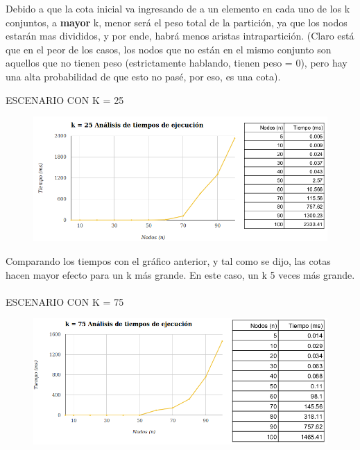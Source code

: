 Debido a que la cota inicial va ingresando de a un elemento en cada uno de los k conjuntos, a \textbf{mayor} k, menor será el peso total de la partición, ya que los nodos estarán mas divididos, y por ende, habrá menos aristas intrapartición. (Claro está que en el peor de los casos, los nodos que no están en el mismo conjunto son aquellos que no tienen peso (estrictamente hablando, tienen peso = 0), pero hay una alta probabilidad de que esto no pasé, por eso, es una cota).

\newpage ESCENARIO CON K = 25
	\begin{figure}[h]
		\begin{center}
		   \includegraphics[scale=0.80]{ejercicio2/k25.png}
		\end{center}
	\end{figure}

Comparando los tiempos con el gráfico anterior, y tal como se dijo, las cotas hacen mayor efecto para un k más grande. En este caso, un k 5 veces más grande.\\
\\

\indent ESCENARIO CON K = 75
	\begin{figure}[h]
		\begin{center}
		   \includegraphics[scale=0.80]{ejercicio2/k75.png}
		\end{center}
	\end{figure}

